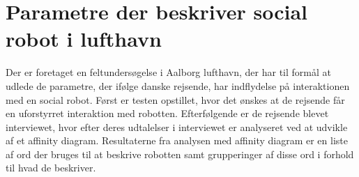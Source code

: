 \chapter*{Parametre der beskriver social robot i lufthavn}
%
Der er foretaget en feltundersøgelse i Aalborg lufthavn, der har til formål at udlede de parametre, der ifølge danske rejsende, har indflydelse på interaktionen med en social robot. Først er testen opstillet, hvor det ønskes at de rejsende får en uforstyrret interaktion med robotten. Efterfølgende er de rejsende blevet interviewet, hvor efter deres udtalelser i interviewet er analyseret ved at udvikle af et affinity diagram. Resultaterne fra analysen med affinity diagram er en liste af ord der bruges til at beskrive robotten samt grupperinger af disse ord i forhold til hvad de beskriver. 